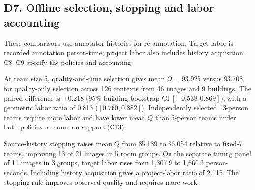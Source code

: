 \subsection*{D7. Offline selection, stopping and labor accounting}
\label{supp:d7-labor}
\label{sec:labor-history}

These comparisons use annotator histories for re-annotation. Target labor is recorded annotation person-time; project labor also includes history acquisition. C8--C9 specify the policies and accounting.

At team size 5, quality-and-time selection gives mean $Q=93.926$ versus 93.708 for quality-only selection across 126 contexts from 46 images and 9 buildings. The paired difference is $+0.218$ (95\% building-bootstrap CI $[-0.538,0.869]$), with a geometric labor ratio of 0.813 ($[0.760,0.882]$). Independently selected 13-person teams require more labor and have lower mean $Q$ than 5-person teams under both policies on common support (C13).

Source-history stopping raises mean $Q$ from 85.189 to 86.054 relative to fixed-7 teams, improving 13 of 21 images in 5 room groups. On the separate timing panel of 11 images in 3 groups, target labor rises from 1,307.9 to 1,660.3 person-seconds. Including history acquisition gives a project-labor ratio of 2.115. The stopping rule improves observed quality and requires more work.
